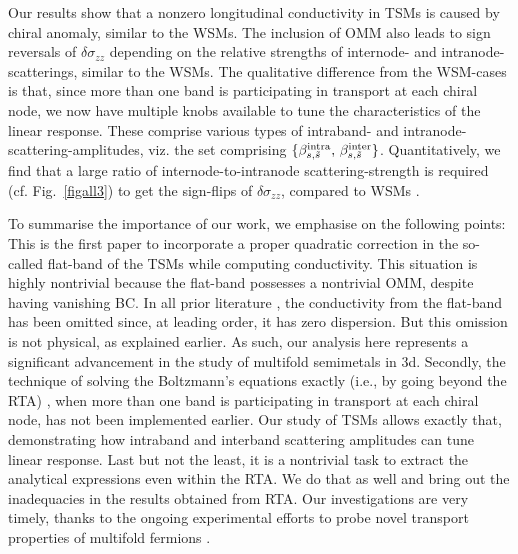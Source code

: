 \documentclass[aps,prb,onecolumn,nofootinbib,citeautoscript,10pt]{revtex4-2}
\begin{document}
Our results show that a nonzero longitudinal conductivity in TSMs is caused by chiral anomaly, similar to the WSMs. The inclusion of OMM also leads to sign reversals of $\delta \sigma_{zz}$ depending on the relative strengths of internode- and intranode-scatterings, similar to the WSMs. The qualitative difference from the WSM-cases is that, since more than one band is participating in transport at each chiral node, we now have multiple knobs available to tune the characteristics of the linear response. These comprise various types of intraband- and intranode-scattering-amplitudes, viz. the set comprising $ \lbrace \beta^{\rm intra}_{s, \tilde s}, \,\beta^{\rm inter}_{s, \tilde s} \rbrace $. Quantitatively, we find that a large ratio of internode-to-intranode scattering-strength is required (cf. Fig.~\ref{figall3}) to get the sign-flips of $\delta \sigma_{zz}$, compared to WSMs \cite{timm}.


To summarise the importance of our work, we emphasise on the following points: This is the first paper to incorporate a proper quadratic correction in the so-called flat-band of the TSMs while computing conductivity. This situation is highly nontrivial because the flat-band possesses a nontrivial OMM, despite having vanishing BC. In all prior literature \cite{pal22b_berry, ips-spin1-ph, ips-internode, girish-internode-spin1}, the conductivity from the flat-band has been omitted since, at leading order, it has zero dispersion. But this omission is not physical, as explained earlier. As such, our analysis here represents a significant advancement in the study of multifold semimetals in 3d. Secondly, the technique of solving the Boltzmann’s equations exactly (i.e., by going beyond the RTA) \cite{timm}, when more than one band is participating in transport at each chiral node, has not been implemented earlier. Our study of TSMs allows exactly that, demonstrating how intraband and interband scattering amplitudes can tune linear response. Last but not the least, it is a nontrivial task to extract the analytical expressions even within the RTA. We do that as well and bring out the inadequacies in the results obtained from RTA. Our investigations are very timely, thanks to the ongoing experimental efforts to probe novel transport properties of multifold fermions \cite{claudia-multifold}.
\end{document}
